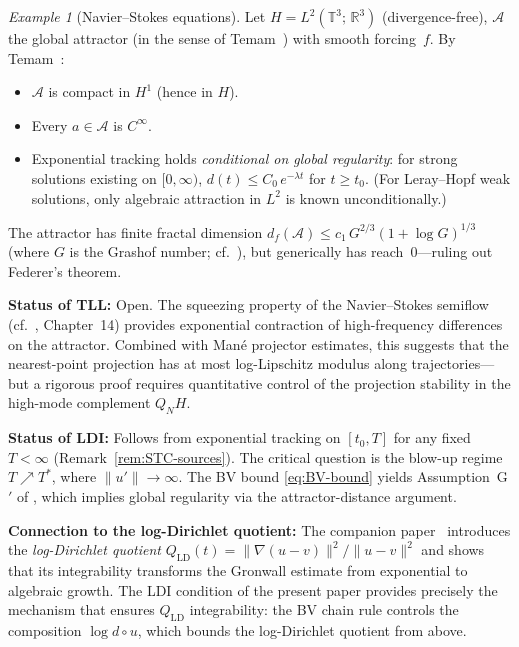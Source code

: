 \documentclass[12pt,a4paper]{article}
\theoremstyle{definition}
\theoremstyle{plain}
\theoremstyle{remark}
\newtheorem{example}[definition]{Example}
\begin{document}
\begin{example}[Navier--Stokes equations]
\label{ex:NS}
Let $H = L^2(\mathbb{T}^3;\,\mathbb{R}^3)$ (divergence-free),
$\mathcal{A}$ the global attractor (in the sense of Temam~\cite{Temam1997}) with smooth
forcing~$f$.  By Temam~\cite{Temam1997}:
\begin{itemize}
  \item $\mathcal{A}$ is compact in $H^1$ (hence in $H$).
  \item Every $a \in \mathcal{A}$ is $C^\infty$.
  \item Exponential tracking holds \emph{conditional on global
    regularity}: for strong solutions existing on $[0,\infty)$,
    $d(t) \le C_0\,e^{-\lambda t}$ for $t \ge t_0$.
    (For Leray--Hopf weak solutions, only algebraic attraction
    in $L^2$ is known unconditionally.)
\end{itemize}

The attractor has finite fractal dimension
$d_f(\mathcal{A}) \le c_1\,G^{2/3}(1+\log G)^{1/3}$
(where $G$ is the Grashof number;
cf.~\cite{ConstantinFoiasTemam1985}), but generically has
reach~$0$---ruling out Federer's theorem.

\medskip\noindent
\textbf{Status of TLL:}\; Open.  The squeezing property of the
Navier--Stokes semiflow (cf.~\cite{FoiasManleyRosaTemam2001},
Chapter~14) provides exponential contraction of high-frequency
differences on the attractor.  Combined with Man\'e projector
estimates, this suggests that the nearest-point projection has
at most log-Lipschitz modulus along trajectories---but a rigorous
proof requires quantitative control of the projection stability
in the high-mode complement $Q_N H$.

\medskip\noindent
\textbf{Status of LDI:}\; Follows from exponential tracking
on $[t_0, T]$ for any fixed $T < \infty$
(Remark~\ref{rem:STC-sources}).  The critical question is the
blow-up regime $T \nearrow T^*$, where $\|u'\| \to \infty$.
The BV bound \eqref{eq:BV-bound} yields Assumption~G$'$ of
\cite{FST-NS2026}, which implies global regularity via the
attractor-distance argument.

\medskip\noindent
\textbf{Connection to the log-Dirichlet quotient:}\;
The companion paper~\cite{FST-NS2026} introduces the
\emph{log-Dirichlet quotient}
$Q_{\mathrm{LD}}(t) = \|\nabla(u-v)\|^2 / \|u-v\|^2$
and shows that its integrability transforms the Gronwall estimate
from exponential to algebraic growth.  The LDI condition of the
present paper provides precisely the mechanism that ensures
$Q_{\mathrm{LD}}$ integrability: the BV chain rule controls the
composition $\log d \circ u$, which bounds the log-Dirichlet quotient
from above.
\end{example}
\end{document}
